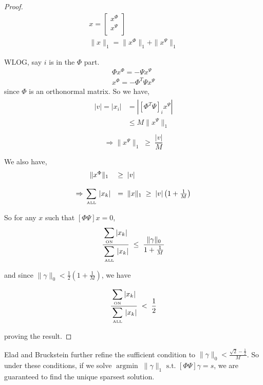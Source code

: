 \documentclass[12pt]{report}
\begin{document}
\begin{proof}
\begin{eqnarray*}
x = \left[ \begin{array}{r}
             x^\Phi \\
	     x^\Psi \\
            \end{array} \right]\\
\|x\|_1 = \|x^\Phi\|_1 + \|x^\Psi\|_1
\end{eqnarray*}

\noindent WLOG, say $i$ is in the $\Phi$ part.
\begin{eqnarray*}
\Phi x^\Phi = -\Psi x^\Psi \\
x^\Phi = -\Phi^T\Psi x^\Psi
\end{eqnarray*}
\noindent since $\Phi$ is an orthonormal matrix. So we have,
\begin{eqnarray*}
\begin{array}{rl}
      |v| = |x_i| &= | \left[ \Phi^T \Psi \right]_i x^\Psi| \\
		  & \leq M \|x^\Psi\|_1
\end{array}\\
\end{eqnarray*}
\begin{equation*}
 \Rightarrow \|x^\Psi\|_1 \; \geq  \; \frac{|v|}{M}
\end{equation*}

\noindent We also have,
\begin{eqnarray*}
\begin{array}{rl}
  \|x^\Phi\|_1 \; &\geq \; |v| \\ \\
  \Rightarrow \displaystyle\sum_{\mbox{\begin{tiny} ALL \end{tiny}}} |x_k| &= \; \|x\|_1 \; \geq \; |v|\left( 1 + \frac{1}{M}\right)
\end{array}
\end{eqnarray*}

\noindent So for any $x$ such that $\left[ \Phi \Psi \right] x = 0$,
\begin{equation*}
  \frac{\displaystyle\sum_{\mbox{\begin{tiny} ON \end{tiny}}}|x_k|}{\displaystyle\sum_{\mbox{\begin{tiny} ALL \end{tiny}}}|x_k|} \; \leq \; \frac{\|\gamma\|_0}{1+\frac{1}{M}}
\end{equation*}

\noindent and since $\|\gamma\|_0 < \frac{1}{2}\left(1+\frac{1}{M}\right)$, we have

\begin{equation*}
 \frac{\displaystyle\sum_{\mbox{\begin{tiny} ON \end{tiny}}}|x_k|}{\displaystyle\sum_{\mbox{\begin{tiny} ALL \end{tiny}}}|x_k|} \; < \; \frac{1}{2}
\end{equation*}

\noindent proving the result.

\end{proof}

Elad and Bruckstein further refine the sufficient condition to $\|\gamma\|_0 < \frac{\sqrt{2}-\frac{1}{2}}{M}$.
So under these conditions, if we solve $\operatorname{argmin}\; \|\gamma\|_1 \mbox{ s.t. } \left[ \Phi \Psi \right] \gamma=s$,
we are guaranteed to find the unique sparsest solution.
\end{document}
